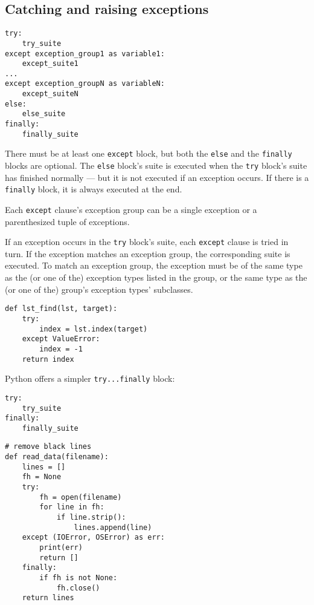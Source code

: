 \subsection{Catching and raising exceptions}

\begin{tcolorbox}
\begin{verbatim}
try:
    try_suite
except exception_group1 as variable1:
    except_suite1
...
except exception_groupN as variableN:
    except_suiteN
else:
    else_suite
finally:
    finally_suite
\end{verbatim}
  
\end{tcolorbox}


There must be at least one \verb|except| block, but both the \verb|else| and the \verb|finally| blocks are optional.
The \verb|else| block’s suite is executed when the \verb|try| block’s suite has finished normally --- but it is not executed if an exception occurs.
If there is a \verb|finally| block, it is always executed at the end.

Each \verb|except| clause’s exception group can be a single exception or a parenthesized tuple of exceptions. 

If an exception occurs in the \verb|try| block’s suite, each \verb|except| clause is tried in turn.
If the exception matches an exception group, the corresponding suite is executed.
To match an exception group, the exception must be of the same type as the (or one of the) exception types listed in the group, or the same type as the (or one of the) group’s exception types’ subclasses.



\begin{lstlisting}
def lst_find(lst, target):
    try:
        index = lst.index(target)
    except ValueError:
        index = -1
    return index  
\end{lstlisting}




Python offers a simpler \verb|try...finally| block:
\begin{tcolorbox}
\begin{verbatim}
try:
    try_suite
finally:
    finally_suite
\end{verbatim}
  
\end{tcolorbox}



\begin{lstlisting}
# remove black lines
def read_data(filename):
    lines = []
    fh = None
    try:
        fh = open(filename)
        for line in fh:
            if line.strip():
                lines.append(line)
    except (IOError, OSError) as err:
        print(err)
        return []
    finally:
        if fh is not None:
            fh.close()
    return lines  
\end{lstlisting}




